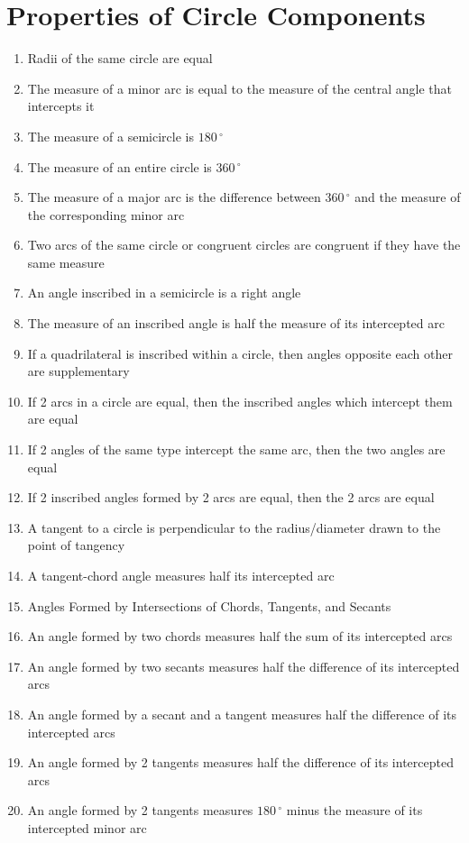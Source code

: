 \section*{Properties of Circle Components}
\begin{enumerate}
    \item Radii of the same circle are equal
    \item The measure of a minor arc is equal to the measure of the central angle that intercepts it
    \item The measure of a semicircle is $180\,^{\circ}$
    \item The measure of an entire circle is $360\,^{\circ}$
    \item The measure of a major arc is the difference between  $360\,^{\circ}$ and the measure of the corresponding minor arc
    \item Two arcs of the same circle or congruent circles are congruent if they have the same measure
    \item An angle inscribed in a semicircle is a right angle
    \item The measure of an inscribed angle is half the measure of its intercepted arc
    \item If a quadrilateral is inscribed within a circle, then angles opposite each other are supplementary
    \item If 2 arcs in a circle are equal, then the inscribed angles which intercept them are equal
    \item If 2 angles of the same type intercept the same arc, then the two angles are equal
    \item If 2 inscribed angles formed by 2 arcs are equal, then the 2 arcs are equal
    \item A tangent to a circle is perpendicular to the radius/diameter drawn to the point of tangency
    \item A tangent-chord angle measures half its intercepted arc
    \item Angles Formed by Intersections of Chords, Tangents, and Secants
    \item An angle formed by two chords measures half the sum of its intercepted arcs
    \item An angle formed by two secants measures half the difference of its intercepted arcs
    \item An angle formed by a secant and a tangent measures half the difference of its intercepted arcs
    \item An angle formed by 2 tangents measures half the difference of its intercepted arcs
    \item An angle formed by 2 tangents measures $180\,^{\circ}$ minus the measure of its intercepted minor arc
\end{enumerate}

